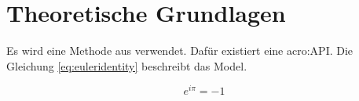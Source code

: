 
\chapter{Theoretische Grundlagen} %
\label{cha:theoretische_grundlagen}

Es wird eine Methode aus \cite{knuth1997art} verwendet. Dafür existiert eine \gls{acro:API}. Die Gleichung \ref{eq:euleridentity} beschreibt das Model.

\begin{equation}\label{eq:euleridentity}
    e^{i\pi} = -1
\end{equation}
